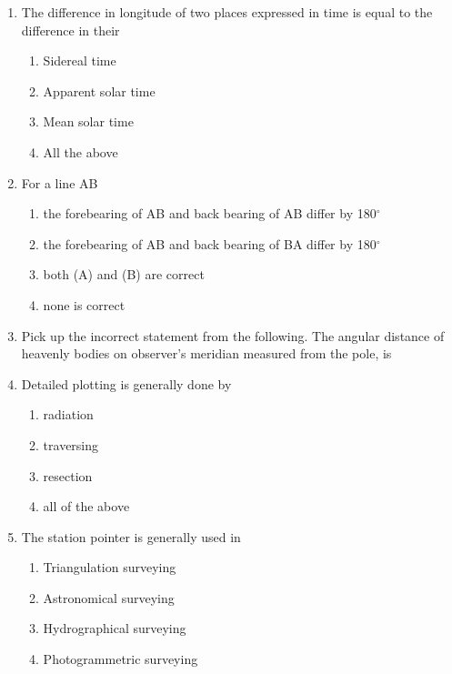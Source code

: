 \documentclass[11pt,a4paper]{article}
\begin{document}
\begin{enumerate}
\item{The difference in longitude of two places expressed in time is equal to the difference in their}
\begin{enumerate}[label=\Alph*.]
\item{Sidereal time}
\item{Apparent solar time}
\item{Mean solar time}
\item{All the above}
\end{enumerate}
\item{For a line AB}
\begin{enumerate}[label=\Alph*.]
\item{the forebearing of AB and back bearing of AB differ by 180$^\circ$}
\item{the forebearing of AB and back bearing of BA differ by 180$^\circ$}
\item{both (A) and (B) are correct}
\item{none is correct}
\end{enumerate}
\item{Pick up the incorrect statement from the following. The angular distance of heavenly bodies on observer's meridian measured from the pole, is}
\\
\item{Detailed plotting is generally done by}
\begin{enumerate}[label=\Alph*.]
\item{radiation}
\item{traversing}
\item{resection}
\item{all of the above}
\end{enumerate}
\item{The station pointer is generally used in}
\begin{enumerate}[label=\Alph*.]
\item{Triangulation surveying}
\item{Astronomical surveying}
\item{Hydrographical surveying}
\item{Photogrammetric surveying}

\end{enumerate}
\end{enumerate}
\end{document}

